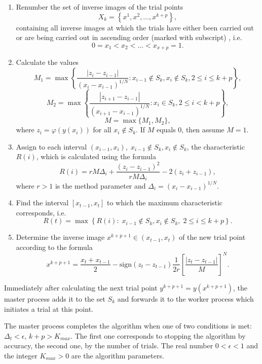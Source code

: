 \documentclass{svproc}
\begin{document}
\begin{enumerate}
	\item 
Renumber the set of inverse images of the trial points 
\[
X_k = \left\{x^1, x^2,...,x^{k+p} \right\},
\]
containing all inverse images at which the trials have either been carried out or are being carried out in ascending order (marked with subscript) , i.e.
\[
0=x_1<x_2<...<x_{x+p}=1.
\]
	\item
Calculate the values
\[
M_1=\max \left\{ \frac{ \left|z_i - z_{i-1} \right|}{(x_i-x_{i-1})^{1/N}} : x_{i-1} \notin S_k, x_i \notin S_k, 2\leq i\leq k+p \right\},
\]
\[
M_2=\max \left\{ \frac{ \left|z_{i+1} - z_{i-1} \right|}{(x_{i+1}-x_{i-1})^{1/N}} : x_i \in S_k, 2\leq i < k+p \right\},
\]
\[
M=\max\{M_1,M_2\},
\]
where $z_i=\varphi(y(x_i))$ for all $x_i \notin S_k$. 
If $M$ equals 0, then assume $M=1$.

	\item
Assign to each interval $(x_{i-1},x_i), \; x_{i-1} \notin S_k, x_i \notin S_k$, the characteristic $R(i)$, which is calculated using the formula
\begin{equation} \label{R}
R(i)=rM\Delta_i+\frac{(z_i-z_{i-1})^2}{rM\Delta_i}-2(z_i+z_{i-1}),
\end{equation}
where $r>1$ is the method parameter and $\Delta_i=\left(x_i-x_{i-1}\right)^{1/N}$.

	\item
Find the interval $[x_{t-1},x_t]$ to which the maximum characteristic corresponds, i.e.
\[
R(t) = \max \left\{ R(i): \; x_{i-1} \notin S_k, x_i \notin S_k, \; 2\leq i\leq k+p \right\}.
\]
	\item
Determine the inverse image $x^{k+p+1} \in (x_{t-1},x_t)$ of the new trial point according to the formula
\[
x^{k+p+1} = \frac{x_{t}+x_{t-1}}{2} - \mathrm{sign}(z_{t}-z_{t-1})\frac{1}{2r}\left[\frac{\left|z_{t}-z_{t-1}\right|}{M}\right]^N.
\]
\end{enumerate}

Immediately after calculating the next trial point $y^{k+p+1} = y(x^{k+p+1})$, the master process adds it to the set $S_k$ and forwards it to the worker process which initiates a trial at this point.

The master process completes the algorithm when one of two conditions is met: $\Delta_{t}<\epsilon$, $k+p>K_{max}$.
The first one corresponds to stopping the algorithm by accuracy, the second one, by the number of trials. The real number $0<\epsilon<1$ and the integer $K_{max}>0$ are the algorithm parameters.
\end{document}
